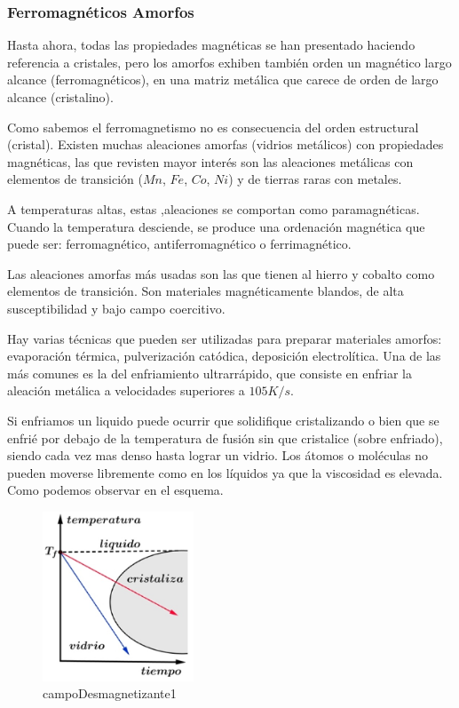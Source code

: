\subsubsection{Ferromagnéticos Amorfos}

Hasta ahora, todas las propiedades magnéticas se han presentado haciendo referencia a cristales, pero los amorfos exhiben también orden un magnético largo alcance (ferromagnéticos), en una matriz metálica que carece de orden de largo alcance (cristalino).

Como sabemos el ferromagnetismo no es consecuencia del orden estructural (cristal). Existen muchas aleaciones amorfas (vidrios metálicos) con propiedades magnéticas, las que revisten mayor interés son las aleaciones metálicas con elementos de transición ($Mn$, $Fe$, $Co$, $Ni$) y de tierras raras con metales.

A temperaturas altas, estas ,aleaciones se comportan como paramagnéticas. Cuando la temperatura desciende, se produce una ordenación magnética que puede ser: ferromagnético, antiferromagnético o ferrimagnético.

Las aleaciones amorfas más usadas son las que tienen al hierro y cobalto como elementos de transición. Son materiales magnéticamente blandos, de alta susceptibilidad y bajo campo coercitivo.

Hay varias técnicas que pueden ser utilizadas para preparar materiales amorfos: evaporación térmica, pulverización catódica, deposición electrolítica. Una de las más comunes es la del enfriamiento ultrarrápido, que consiste en enfriar la aleación metálica a velocidades superiores a $105 K/s.$

Si enfriamos un liquido puede ocurrir que solidifique cristalizando o bien que se enfrié por debajo de la temperatura de
fusión sin que cristalice (sobre enfriado), siendo cada vez mas denso hasta lograr un vidrio. Los átomos o moléculas no pueden moverse libremente como en los líquidos ya que la viscosidad es elevada. Como podemos observar en el esquema.

\begin{figure}[H]
    \centering
    \includegraphics[width=0.4\textwidth]{./Figures/amorfos1}
	\caption{campoDesmagnetizante1}
	\label{fig:amorfos1}
\end{figure}


